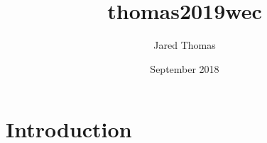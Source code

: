 \documentclass{article}
\title{thomas2019wec}
\author{Jared Thomas}
\date{September 2018}
\begin{document}
\maketitle

\section{Introduction}
\end{document}
